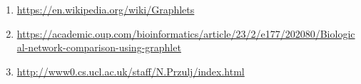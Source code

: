 \documentclass[a4,center,fleqn]{NAR}
\begin{document}
\begin{enumerate}
    \item \url{https://en.wikipedia.org/wiki/Graphlets}
    \item \url{https://academic.oup.com/bioinformatics/article/23/2/e177/202080/Biological-network-comparison-using-graphlet}
    \item \url{http://www0.cs.ucl.ac.uk/staff/N.Przulj/index.html}
\end{enumerate}



\end{document}
